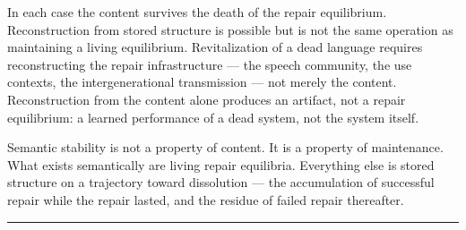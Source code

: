 \documentclass[11pt, a4paper]{article}
\theoremstyle{definition}
\theoremstyle{remark}
\begin{document}
In each case the content survives the death of the repair equilibrium.
Reconstruction from stored structure is possible but is not the same operation
as maintaining a living equilibrium. Revitalization of a dead language requires
reconstructing the repair infrastructure --- the speech community, the use
contexts, the intergenerational transmission --- not merely the content.
Reconstruction from the content alone produces an artifact, not a repair
equilibrium: a learned performance of a dead system, not the system itself.

Semantic stability is not a property of content. It is a property of
maintenance. What exists semantically are living repair equilibria. Everything
else is stored structure on a trajectory toward dissolution --- the accumulation
of successful repair while the repair lasted, and the residue of failed repair
thereafter.

\bigskip

\noindent\rule{0.4\textwidth}{0.4pt}

\vspace{0.5em}
\end{document}
